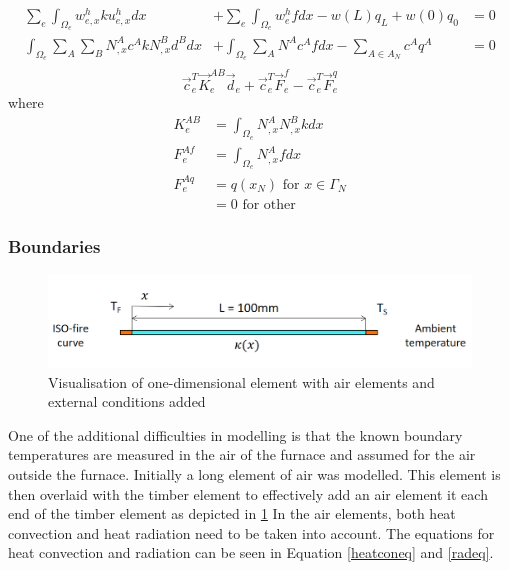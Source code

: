 	\begin{equation}
	\label{heateq4}
	\begin{aligned}
	\sum_e \int_{\Omega_e} w_{e,x}^h k  u_{e,x}^h dx &+ \sum_e \int_{\Omega_e} w_e^h f dx - w(L)q_L + w(0)q_0 &= 0\\
	\int_{\Omega_e} \sum_A \sum_B N_{,x}^A c^A k N_{,x}^B d^B dx  &+ \int_{\Omega_e} \sum_{A} N^A c^A f dx - \sum_{A\in A_N} c^A q^A &= 0\\
	\end{aligned}
	\end{equation}
	\begin{equation}
	\label{heateq5}
	\vec{c}_e^T \vec{K}_e^{AB} \vec{d}_e + \vec{c}_e^T \vec{F}_e^f -\vec{c}_e^T \vec{F}_e^q
	\end{equation}
	where
	\begin{equation*}
	\begin{aligned}
	K_e^{AB} &= \int_{\Omega_e}N_{,x}^AN_{,x}^B k dx\\
	F_e^{Af} &= \int_{\Omega_e}N_{,x}^A f dx\\
	F_e^{Aq} &= q(x_N) \text{ for } x \in \Gamma_N\\
	&= 0 \text{ for other }
	\end{aligned}
	\end{equation*}
	
	\subsubsection{Boundaries}
	\begin{figure}[H]\label{airelmfig}
	\centering
	\includegraphics[width = 0.75\linewidth]{figures/fem_fire_sketch.png}
	\caption{Visualisation of one-dimensional element with air elements and external conditions added}
	\end{figure}
	
	One of the additional difficulties in modelling is that the known boundary temperatures are measured in the air of the furnace and assumed for the air outside the furnace.
	Initially a long element of air was modelled.
	This element is then overlaid with the timber element to effectively add an air element it each end of the timber element as depicted in \ref{airelmfig}
	In the air elements, both heat convection and heat radiation need to be taken into account.
	The equations for heat convection and radiation can be seen in Equation \ref{heatconeq} and \ref{radeq}.
	
